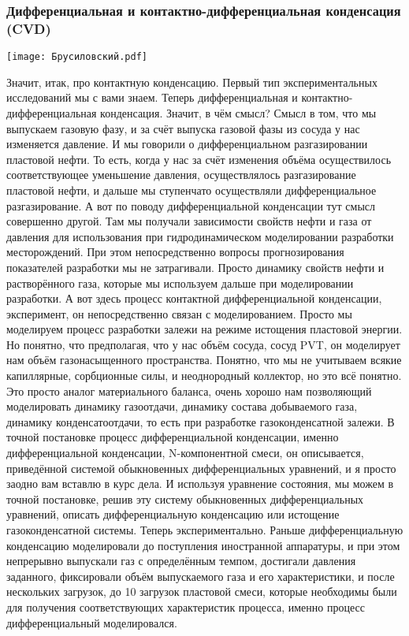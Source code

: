 \documentclass[main.tex]{subfiles}
\begin{document}
\subsubsection{Дифференциальная и контактно-дифференциальная конденсация (CVD)}

\begin{center}
\texttt{[image: Брусиловский.pdf]}
\end{center}

Значит, итак, про контактную конденсацию.
Первый тип экспериментальных исследований мы с вами знаем.
Теперь дифференциальная и контактно-дифференциальная конденсация.
Значит, в чём смысл?
Смысл в том, что мы выпускаем газовую фазу, и за счёт выпуска газовой фазы из сосуда у нас изменяется давление.
И мы говорили о дифференциальном разгазировании пластовой нефти.
То есть, когда у нас за счёт изменения объёма осуществилось соответствующее уменьшение давления, осуществлялось разгазирование пластовой нефти, и дальше мы ступенчато осуществляли дифференциальное разгазирование.
А вот по поводу дифференциальной конденсации тут смысл совершенно другой.
Там мы получали зависимости свойств нефти и газа от давления для использования при гидродинамическом моделировании разработки месторождений.
При этом непосредственно вопросы прогнозирования показателей разработки мы не затрагивали.
Просто динамику свойств нефти и растворённого газа, которые мы используем дальше при моделировании разработки.
А вот здесь процесс контактной дифференциальной конденсации, эксперимент, он непосредственно связан с моделированием.
Просто мы моделируем процесс разработки залежи на режиме истощения пластовой энергии.
Но понятно, что предполагая, что у нас объём сосуда, сосуд PVT, он моделирует нам объём газонасыщенного пространства.
Понятно, что мы не учитываем всякие капиллярные, сорбционные силы, и неоднородный коллектор, но это всё понятно.
Это просто аналог материального баланса, очень хорошо нам позволяющий моделировать динамику газоотдачи, динамику состава добываемого газа, динамику конденсатоотдачи, то есть при разработке газоконденсатной залежи.
В точной постановке процесс дифференциальной конденсации, именно дифференциальной конденсации, N-компонентной смеси, он описывается, приведённой системой обыкновенных дифференциальных уравнений, и я просто заодно вам вставлю в курс дела.
И используя уравнение состояния, мы можем в точной постановке, решив эту систему обыкновенных дифференциальных уравнений, описать дифференциальную конденсацию или истощение газоконденсатной системы.
Теперь экспериментально.
Раньше дифференциальную конденсацию моделировали до поступления иностранной аппаратуры, и при этом непрерывно выпускали газ с определённым темпом, достигали давления заданного, фиксировали объём выпускаемого газа и его характеристики, и после нескольких загрузок, до 10 загрузок пластовой смеси, которые необходимы были для получения соответствующих характеристик процесса, именно процесс дифференциальный моделировался.
\end{document}
